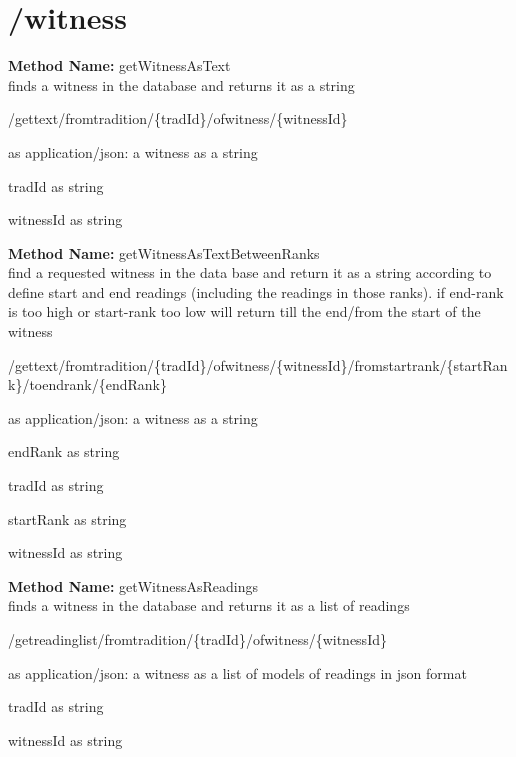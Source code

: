 \section{/witness}
\textbf{Method Name: }getWitnessAsText \\ finds a witness in the database and returns it as a string
\begin{get}
/gettext/fromtradition/\{tradId\}/ofwitness/\{witnessId\}
\end{get}
\begin{response}
 as application/json: a witness as a string
\end{response}
\begin{parameter}
tradId as string
\end{parameter}
\begin{parameter}
witnessId as string
\end{parameter}
\textbf{Method Name: }getWitnessAsTextBetweenRanks \\ find a requested witness in the data base and return it as a string according to define start and end readings (including the readings in those ranks). if end-rank is too high or start-rank too low will return till the end/from the start of the witness
\begin{get}
/gettext/fromtradition/\{tradId\}/ofwitness/\{witnessId\}/fromstartrank/\{startRank\}/toendrank/\{endRank\}
\end{get}
\begin{response}
 as application/json: a witness as a string
\end{response}
\begin{parameter}
endRank as string
\end{parameter}
\begin{parameter}
tradId as string
\end{parameter}
\begin{parameter}
startRank as string
\end{parameter}
\begin{parameter}
witnessId as string
\end{parameter}
\textbf{Method Name: }getWitnessAsReadings \\ finds a witness in the database and returns it as a list of readings
\begin{get}
/getreadinglist/fromtradition/\{tradId\}/ofwitness/\{witnessId\}
\end{get}
\begin{response}
 as application/json: a witness as a list of models of readings in json format
\end{response}
\begin{parameter}
tradId as string
\end{parameter}
\begin{parameter}
witnessId as string
\end{parameter}
